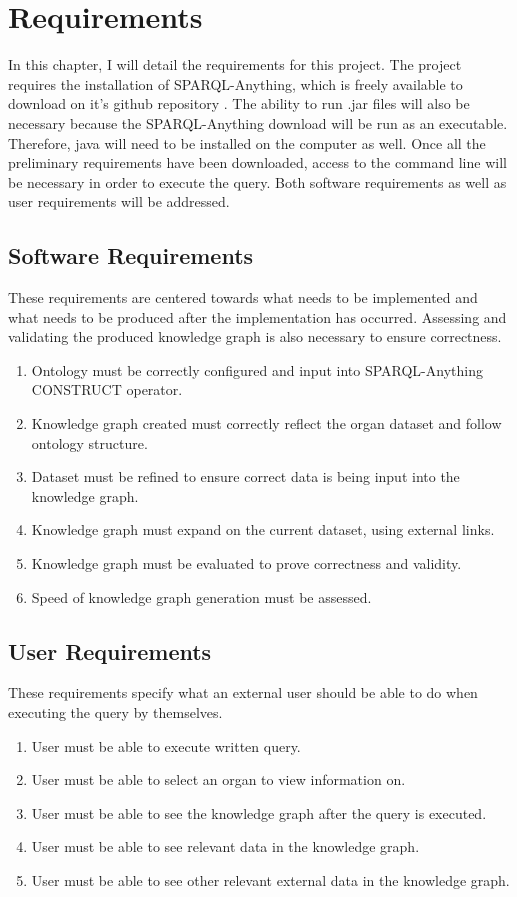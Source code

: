 \chapter{Requirements}
In this chapter, I will detail the requirements for this project. The project requires the installation of SPARQL-Anything, which is freely available to download on it's github repository \cite{sparqlanythinggithub}. The ability to run .jar files will also be necessary because the SPARQL-Anything download will be run as an executable. Therefore, java will need to be installed on the computer as well. Once all the preliminary requirements have been downloaded, access to the command line will be necessary in order to execute the query. Both software requirements as well as user requirements will be addressed.

\section{Software Requirements}
\hspace{0.5cm} These requirements are centered towards what needs to be implemented and what needs to be produced after the implementation has occurred. Assessing and validating the produced knowledge graph is also necessary to ensure correctness.
\begin{enumerate}
\item Ontology must be correctly configured and input into SPARQL-Anything CONSTRUCT operator.
\item Knowledge graph created must correctly reflect the organ dataset and follow ontology structure.
\item Dataset must be refined to ensure correct data is being input into the knowledge graph.
\item Knowledge graph must expand on the current dataset, using external links.
\item Knowledge graph must be evaluated to prove correctness and validity.
\item Speed of knowledge graph generation must be assessed.
\end{enumerate}

\section{User Requirements}
\hspace{0.5cm} These requirements specify what an external user should be able to do when executing the query by themselves. 
\begin{enumerate}
\item User must be able to execute written query.
\item User must be able to select an organ to view information on. 
\item User must be able to see the knowledge graph after the query is executed.
\item User must be able to see relevant data in the knowledge graph.
\item User must be able to see other relevant external data in the knowledge graph.
\end{enumerate}

